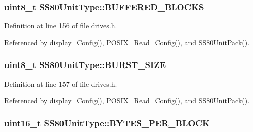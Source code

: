 \subsubsection[{\texorpdfstring{B\+U\+F\+F\+E\+R\+E\+D\+\_\+\+B\+L\+O\+C\+KS}{BUFFERED_BLOCKS}}]{\setlength{\rightskip}{0pt plus 5cm}uint8\+\_\+t S\+S80\+Unit\+Type\+::\+B\+U\+F\+F\+E\+R\+E\+D\+\_\+\+B\+L\+O\+C\+KS}\hypertarget{structSS80UnitType_a575a381fe873ba8ba9aa4630673516a4}{}\label{structSS80UnitType_a575a381fe873ba8ba9aa4630673516a4}


Definition at line 156 of file drives.\+h.



Referenced by display\+\_\+\+Config(), P\+O\+S\+I\+X\+\_\+\+Read\+\_\+\+Config(), and S\+S80\+Unit\+Pack().

\subsubsection[{\texorpdfstring{B\+U\+R\+S\+T\+\_\+\+S\+I\+ZE}{BURST_SIZE}}]{\setlength{\rightskip}{0pt plus 5cm}uint8\+\_\+t S\+S80\+Unit\+Type\+::\+B\+U\+R\+S\+T\+\_\+\+S\+I\+ZE}\hypertarget{structSS80UnitType_a4bc66bc02c06dbfe279be6d2af808a04}{}\label{structSS80UnitType_a4bc66bc02c06dbfe279be6d2af808a04}


Definition at line 157 of file drives.\+h.



Referenced by display\+\_\+\+Config(), P\+O\+S\+I\+X\+\_\+\+Read\+\_\+\+Config(), and S\+S80\+Unit\+Pack().

\subsubsection[{\texorpdfstring{B\+Y\+T\+E\+S\+\_\+\+P\+E\+R\+\_\+\+B\+L\+O\+CK}{BYTES_PER_BLOCK}}]{\setlength{\rightskip}{0pt plus 5cm}uint16\+\_\+t S\+S80\+Unit\+Type\+::\+B\+Y\+T\+E\+S\+\_\+\+P\+E\+R\+\_\+\+B\+L\+O\+CK}\hypertarget{structSS80UnitType_a18a5f03be6bea14c6c4a1f9b952bb160}{}\label{structSS80UnitType_a18a5f03be6bea14c6c4a1f9b952bb160}


